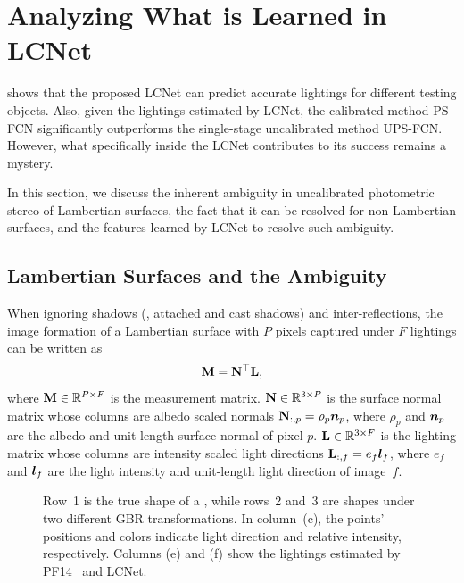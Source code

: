\section{Analyzing What is Learned in LCNet}
\label{sec:LCNet_analysis}
 shows that the proposed LCNet can predict accurate lightings for different testing objects. Also, given the lightings estimated by LCNet, the calibrated method PS-FCN significantly outperforms the single-stage uncalibrated method UPS-FCN.
However, what specifically inside the LCNet contributes to its success remains a mystery.

In this section, we discuss the inherent ambiguity in uncalibrated photometric stereo of Lambertian surfaces, the fact that it can be resolved for non-Lambertian surfaces, and the features learned by LCNet to resolve such ambiguity.

\newcommand{\numpixels}{\ensuremath{P}}
\newcommand{\pixelindex}{\ensuremath{p}}
\newcommand{\numlightings}{\ensuremath{F}}
\newcommand{\lightingindex}{\ensuremath{f}}
\subsection{Lambertian Surfaces and the \gbr Ambiguity}
When ignoring shadows (\ie, attached and cast shadows) and inter-reflections, the image formation of a Lambertian surface with $\numpixels$ pixels captured under $\numlightings$ lightings can be written as
\begin{equation}
    \mathbf{M} = \mathbf{N}^\top \mathbf{L},
\end{equation}
where \hbox{$\V{M} \in \mathbb{R}^{\numpixels \times \numlightings}$} is the measurement matrix. 
\hbox{$\V{N} \in \mathbb{R}^{3\times \numpixels}$} is the surface normal matrix whose columns are albedo scaled normals \hbox{$\V{N}_{:,\pixelindex}=\rho_\pixelindex\vn_\pixelindex$}, where $\rho_\pixelindex$ and $\vn_\pixelindex$ are the albedo and unit-length surface normal of pixel $\pixelindex$.
\hbox{$\V{L} \in \mathbb{R}^{3\times \numlightings}$} is the lighting matrix whose columns are intensity scaled light directions $\mathbf{L}_{:,f} = e_f\boldsymbol{l}_f$, where $e_f$ and $\boldsymbol{l}_f$ are the light intensity and unit-length light direction of image~$f$.

\begin{figure}[htbp] \centering
	
    \caption[Results of PF14 and LCNet on shapes under different GBR transformation]{Row~1 is the true shape of a , while rows~2 and~3 are shapes under two different GBR transformations. In column~(c), the points' positions and colors indicate light direction and relative intensity, respectively. Columns (e) and (f) show the lightings estimated by PF14~\cite{papad14closed} and LCNet.}\label{fig:gbr}
\end{figure}
    
